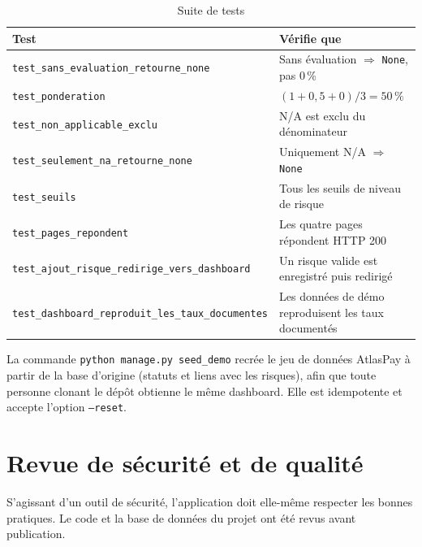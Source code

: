 \documentclass[11pt,a4paper]{article}
\newcommand{\code}[1]{\texttt{#1}}
\begin{document}
\begin{table}[H]
\centering\small
\begin{tabularx}{\linewidth}{@{}lX@{}}
\toprule
\textbf{Test} & \textbf{Vérifie que}\\
\midrule
\code{test\_sans\_evaluation\_retourne\_none} & Sans évaluation $\Rightarrow$ \code{None}, pas 0\,\%\\
\code{test\_ponderation} & $(1+0{,}5+0)/3 = 50\,\%$\\
\code{test\_non\_applicable\_exclu} & N/A est exclu du dénominateur\\
\code{test\_seulement\_na\_retourne\_none} & Uniquement N/A $\Rightarrow$ \code{None}\\
\code{test\_seuils} & Tous les seuils de niveau de risque\\
\code{test\_pages\_repondent} & Les quatre pages répondent HTTP 200\\
\code{test\_ajout\_risque\_redirige\_vers\_dashboard} & Un risque valide est enregistré puis redirigé\\
\code{test\_dashboard\_reproduit\_les\_taux\_documentes} & Les données de démo reproduisent les taux documentés\\
\bottomrule
\end{tabularx}
\caption{Suite de tests}
\end{table}

La commande \code{python manage.py seed\_demo} recrée le jeu de données AtlasPay à partir de la base d'origine (statuts et liens avec les risques), afin que toute personne clonant le dépôt obtienne le même dashboard. Elle est idempotente et accepte l'option \code{--reset}.

\section{Revue de sécurité et de qualité}
S'agissant d'un outil de sécurité, l'application doit elle-même respecter les bonnes pratiques. Le code et la base de données du projet ont été revus avant publication.
\end{document}
